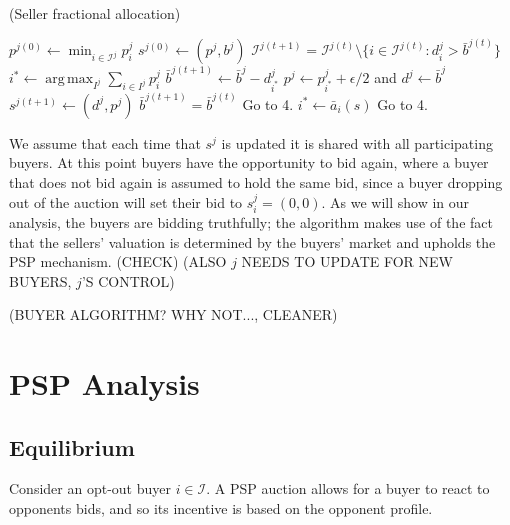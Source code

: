 \documentclass[12pt]{article}
\theoremstyle{definition}
\newcommand{\mcI}{\mathcal{I}}
\DeclareMathOperator*{\argmax}{arg\,max}
\begin{document}
\begin{multicols}{2}
\begin{algorithm}[H]
\caption{(Seller fractional allocation)}
\begin{algorithmic}[1]
\State $p^{j(0)} \gets \min_{i\in\mcI^j} p_i^j$
\State $s^{j(0)} \gets (p^j, b^j)$
\State $\mcI^{j(t+1)} = \mcI^{j(t)}\setminus \lbrace i \in \mcI^{j(t)}: d_i^j >
\bar{b}^{j(t)}\rbrace$
\State $ i^* \gets \displaystyle\argmax_{I^j}\sum_{i\in I^j} p_i^j$ 
\State $\bar{b}^{j(t+1)} \gets \bar{b}^j - d_{i^*}^{j}$
\State $p^j \gets p_{i^*}^j+\epsilon/2$ and $d^j \gets \bar{b}^j$
\State $s^{j(t+1)} \gets (d^j, p^j)$
\State $\bar{b}^{j(t+1)} = \bar{b}^{j(t)}$
\State Go to 4.
\Else
\State $i^* \gets \bar a_i(s)$
\State Go to 4.
\EndIf
\EndWhile
\end{algorithmic}
\end{algorithm}
We assume that each time that $s^j$ is updated it is shared with all
participating buyers. At this point buyers have the opportunity to bid again,
where a buyer that does not bid again is assumed to hold the same bid, since a
buyer dropping out of the auction will set their bid to $s_i^j=(0,0)$. As we will show in our analysis, the buyers are bidding truthfully; the
algorithm makes use of the fact that the sellers' valuation is determined by
the buyers' market and upholds the PSP mechanism. (CHECK) (ALSO $j$ NEEDS TO
UPDATE FOR NEW BUYERS, $j$'S CONTROL)

(BUYER ALGORITHM? WHY NOT..., CLEANER)

\section{PSP Analysis}\label{analysis}
\subsection{Equilibrium}

Consider an opt-out buyer $i\in\mcI$. A PSP auction
allows for a buyer to react to opponents bids, and so its incentive is based on
the opponent profile.


\end{multicols}
\end{document}
